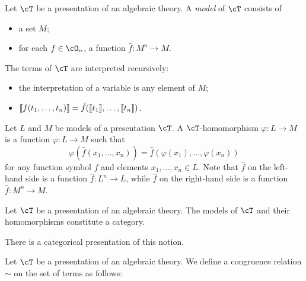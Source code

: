 \documentclass{amsart}
\begin{document}
\begin{defn}
  Let $\cT$ be a presentation of an algebraic theory.
  A \emph{model} of $\cT$ consists of
  \begin{itemize}
  \item a set $M$;
  \item for each $f \in \cO_{n}$, a function $\hat{f} : M^{n} \to M$.
  \end{itemize}
  The terms of $\cT$ are interpreted recursively:
  \begin{itemize}
  \item the interpretation of a variable is any element of $M$;
  \item $\llbracket f(t_{1},\ldots,t_{n}) \rrbracket = \hat{f}(\llbracket t_{1} \rrbracket,\ldots,\llbracket t_{n} \rrbracket)$.
  \end{itemize}
\end{defn}

\begin{defn}
  Let $L$ and $M$ be models of a presentation $\cT$.
  A $\cT$-homomorphism $\varphi : L \to M$ is a function $\varphi : L \to M$ such that
  \[
    \varphi(\hat{f}(x_{1},\ldots,x_{n})) = \hat{f}(\varphi(x_{1}),\ldots,\varphi(x_{n}))
  \]
  for any function symbol $f$ and elements $x_{1},\ldots,x_{n} \in L$.
  Note that $\hat{f}$ on the left-hand side is a function $\hat{f} : L^{n} \to L$, while $\hat{f}$ on the right-hand side is a function $\hat{f} : M^{n} \to M$.
\end{defn}

\begin{lem}
  Let $\cT$ be a presentation of an algebraic theory.
  The models of $\cT$ and their homomorphisms constitute a category.
\end{lem}

There is a categorical presentation of this notion.

\begin{defn}
  Let $\cT$ be a presentation of an algebraic theory.
  We define a congruence relation $\sim$ on the set of terms as follows:
\end{defn}
\end{document}
